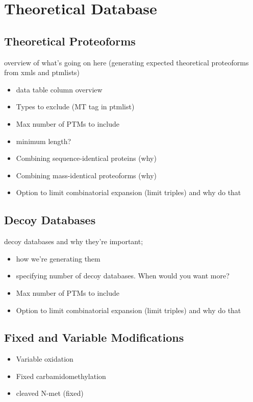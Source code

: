
\section{Theoretical Database}

\subsection{Theoretical Proteoforms}
overview of what's going on here (generating expected theoretical proteoforms from xmls and ptmlists)
\begin{itemize}
	\item data table column overview
	\item Types to exclude (MT tag in ptmlist)
	\item Max number of PTMs to include
	\item minimum length?
	\item Combining sequence-identical proteins (why)
	\item Combining mass-identical proteoforms (why)	
	\item Option to limit combinatorial expansion (limit triples) and why do that
\end{itemize}

\subsection{Decoy Databases}
decoy databases and why they're important; 
\begin{itemize}
	\item how we're generating them
	\item specifying number of decoy databases. When would you want more? 
	\item Max number of PTMs to include
	\item Option to limit combinatorial expansion (limit triples) and why do that
\end{itemize}

\subsection{Fixed and Variable Modifications}
\begin{itemize}
	\item Variable oxidation
	\item Fixed carbamidomethylation
	\item cleaved N-met (fixed)
\end{itemize}

